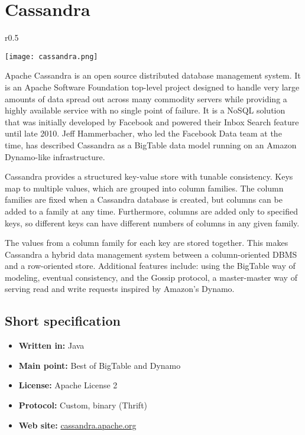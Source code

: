 \chapter{Cassandra}

\begin{wrapfigure}{r}{0.5\textwidth}
  \vspace{-42pt}
  \begin{center}
    \texttt{[image: cassandra.png]}
  \end{center}
  \vspace{-20pt}
\end{wrapfigure}
Apache Cassandra is an open source distributed database management system. It is an Apache Software Foundation top-level project designed to handle very large amounts of data spread out across many commodity servers while providing a highly available service with no single point of failure. It is a NoSQL solution that was initially developed by Facebook and powered their Inbox Search feature until late 2010. Jeff Hammerbacher, who led the Facebook Data team at the time, has described Cassandra as a BigTable data model running on an Amazon Dynamo-like infrastructure.

Cassandra provides a structured key-value store with tunable consistency. Keys map to multiple values, which are grouped into column families. The column families are fixed when a Cassandra database is created, but columns can be added to a family at any time. Furthermore, columns are added only to specified keys, so different keys can have different numbers of columns in any given family.

The values from a column family for each key are stored together. This makes Cassandra a hybrid data management system between a column-oriented DBMS and a row-oriented store. Additional features include: using the BigTable way of modeling, eventual consistency, and the Gossip protocol, a master-master way of serving read and write requests inspired by Amazon's Dynamo.

\section{Short specification}

\begin{itemize}
  \item \textbf{Written in:} Java
  \item \textbf{Main point:} Best of BigTable and Dynamo
  \item \textbf{License:} Apache License 2
  \item \textbf{Protocol:} Custom, binary (Thrift)
  \item \textbf{Web site:} \href{http://cassandra.apache.org/}{cassandra.apache.org}
\end{itemize}